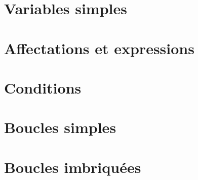 % 


\section{Variables simples}

\pagebreak

\section{Affectations et expressions}

\pagebreak

\section{Conditions}

\pagebreak

\section{Boucles simples}

\pagebreak

\section{Boucles imbriquées}


